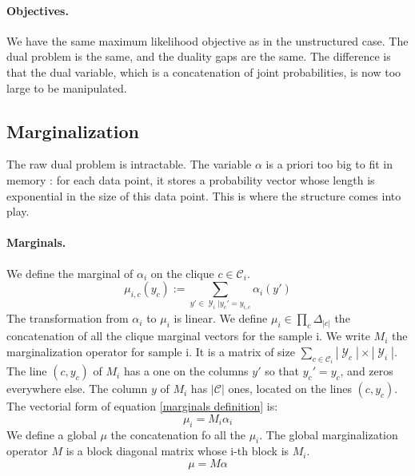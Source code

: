 \documentclass{article}
\DeclareMathOperator{\1}{\mathbb{1}}
\DeclareMathOperator{\Y}{\mathcal{Y}}
\begin{document}
\paragraph{Objectives.}
We have the same maximum likelihood objective as in the unstructured case.
The dual problem is the same, and the duality gaps are the same.
The difference is that the dual variable, which is a concatenation of joint probabilities, is now too large to be manipulated.

\subsection{Marginalization}
The raw dual problem is intractable.
The variable $\alpha$ is a priori too big to fit in memory : for each data point, it stores a probability vector whose length is exponential in the size of this data point.
This is where the structure comes into play.

\paragraph{Marginals.}
We define the marginal of $\alpha_i$ on the clique $c \in \mathcal C_i$.
\begin{equation}
	\label{marginals definition}
	\mu_{i, c}(y_c) := \sum_{y'\in \Y_i | y_c' = y_{i, c}} \alpha_i(y')
\end{equation}
The transformation from $\alpha_i$ to $\mu_i$ is linear.
We define $\mu_i \in \prod_c \Delta_|c|$ the concatenation of all the clique marginal vectors for the sample i.
We write $M_i$ the marginalization operator for sample i.
It is a matrix of size $\sum_{c \in \mathcal C_i} |\Y_c| \times |\Y_i |$.
The line $(c, y_c)$ of $M_i$ has a one on the columns $y'$ so that $y_c'=y_c$, and zeros everywhere else.
The column $y$ of $M_i$ has $|\mathcal C|$ ones, located on the lines $(c, y_c)$.
The vectorial form of equation \ref{marginals definition} is:
\begin{equation*}
	\mu_i = M_i \alpha_i
\end{equation*}
We define a global $\mu$ the concatenation fo all the $\mu_i$.
The global marginalization operator $M$ is a block diagonal matrix whose i-th block is $M_i$.
\begin{equation}
	\label{marginals vectorial}
	\mu = M \alpha
\end{equation} 
\end{document}
